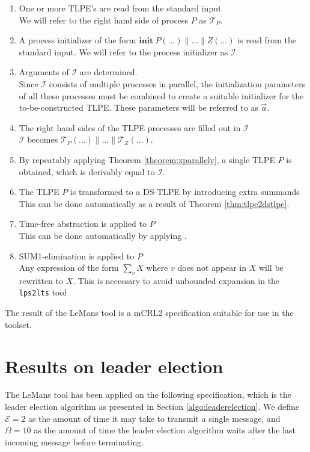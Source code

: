 \begin{enumerate}
\item One or more TLPE's are read from the standard input \\
We will refer to the right hand side of process $P$ as $\mathcal{T}_P$.
\item A process initializer of the form $\textbf{init}~P(\dots) \parallel \dots \parallel Z(\dots)$ is read from the standard input.
We will refer to the process initializer as $\mathcal{I}$.
\item Arguments of $\mathcal{I}$ are determined. \\
Since $\mathcal{I}$ consists of multiple processes in parallel, the initialization parameters of all these processes must be combined to create a suitable initializer for the to-be-constructed TLPE. These parameters will be referred to as $\overrightarrow{a}$.
\item The right hand sides of the TLPE processes are filled out in $\mathcal{I}$ \\
$\mathcal{I}$ becomes $\mathcal{T}_P(\dots) \parallel \dots \parallel \mathcal{T}_Z(\dots)$.
\item By repeatably applying Theorem \ref{theorem:xparallely}, a single TLPE $P$ is obtained, which is derivably equal to $\mathcal{I}$.
\item The TLPE $P$ is transformed to a DS-TLPE by introducing extra summands \\
This can be done automatically as a result of Theorem \ref{thm:tlpe2dstlpe}.
\item Time-free abstraction is applied to $P$ \\
This can be done automatically by applying \cite[Definition 4.4]{reniers02completenesstimed}.
\item SUM1-elimination is applied to $P$ \\
Any expression of the form $\sum_{v} X$ where $v$ does not appear in $X$ will be rewritten to $X$. This is necessary to avoid unbounded expansion in the \texttt{lps2lts} tool
\end{enumerate}

The result of the LeMans tool is a mCRL2 specification suitable for use in the toolset.

\section{Results on leader election}
\label{sec:timedle}

The LeMans tool has been applied on the following specification, which is the leader election algorithm as presented in Section \ref{algo:leaderelection}. We define $\mathcal{E} = 2$ as the amount of time it may take to transmit a single message, and $\Omega = 10$ as the amount of time the leader election algorithm waits after the last incoming message before terminating.

